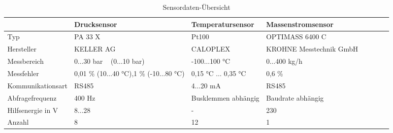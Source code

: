 \begin{table}[htb]
\centering
\caption{Sensordaten-Übersicht}\vspace{6pt}
\label{tab:Messtechnik KA}
\begin{tabular}{p{3cm}p{3cm}p{3cm}p{3.5cm}llll}
\hline 
 & \textbf{Drucksensor} & \textbf{Temperatursensor} & \textbf{Massenstromsensor} \\ 
\hline 
\hline 
Typ & PA 33 X & Pt100 & OPTIMASS 6400 C \\ 
\hline 
Hersteller & KELLER AG & CALOPLEX &  KROHNE Messtechnik GmbH \\ 
\hline 
Messbereich & 0$\dots$30 bar ~ \newline (0$\dots$10 bar) & -100$\dots$100 °C & 0$\dots$400 kg/h \\ 
\hline 
Messfehler & 0,01 $\%$ (10$\dots$40 °C)\newline 0,1 $\%$ (-10$\dots$80 °C) & 0,15 °C $\dots$ 0,35 °C  & 0,6 $\%$ \\ 
\hline 
Kommunikationsart & RS485 & 4$\dots$20 mA & RS485 \\ 
\hline 
Abfragefrequenz & 400 Hz & Busklemmen abhängig & Baudrate abhängig \\ 
\hline 
Hilfsenergie in V & 8$\dots$28 & - & 230  \\ 
\hline
Anzahl & 8  & 12 & 1 \\ 
\hline 
\hline 
\end{tabular} 
\label{tab:Tabelle}
\end{table}
